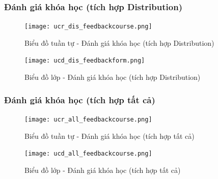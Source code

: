 \documentclass[./../main.tex]{subfiles}
\begin{document}
\subsubsection{Đánh giá khóa học (tích hợp Distribution)}
\begin{figure}[H]
    \centering
    \texttt{[image: ucr\_dis\_feedbackcourse.png]}
    \caption{Biểu đồ tuần tự - Đánh giá khóa học (tích hợp Distribution)}
\end{figure}
\begin{figure}[H]
    \centering
    \texttt{[image: ucd\_dis\_feedbackform.png]}
    \caption{Biểu đồ lớp - Đánh giá khóa học (tích hợp Distribution)}
\end{figure}
\subsubsection{Đánh giá khóa học (tích hợp tất cả)}
\begin{figure}[H]
    \centering
    \texttt{[image: ucr\_all\_feedbackcourse.png]}
    \caption{Biểu đồ tuần tự - Đánh giá khóa học (tích hợp tất cả)}
\end{figure}
\begin{figure}[H]
    \centering
    \texttt{[image: ucd\_all\_feedbackcourse.png]}
    \caption{Biểu đồ lớp - Đánh giá khóa học (tích hợp tất cả)}
\end{figure}

\end{document}
